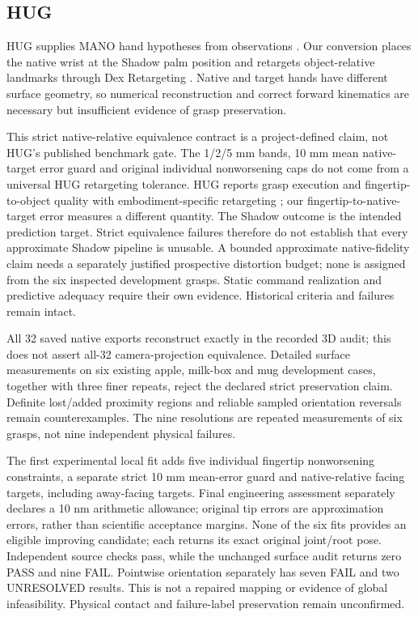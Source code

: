 \documentclass[10pt,letterpaper]{article}
\begin{document}
\subsection{HUG}
HUG supplies MANO hand hypotheses from observations \cite{hug}. Our conversion
places the native wrist at the Shadow palm position and retargets object-relative
landmarks through Dex Retargeting \cite{dex}. Native and target hands have
different surface geometry, so numerical reconstruction and correct forward
kinematics are necessary but insufficient evidence of grasp preservation.

This strict native-relative equivalence contract is a project-defined claim,
not HUG's published benchmark gate. The 1/2/5 mm bands, 10 mm mean
native-target error guard and original individual nonworsening caps do not
come from a universal HUG retargeting tolerance. HUG reports grasp execution
and fingertip-to-object quality with embodiment-specific retargeting
\cite{hug}; our fingertip-to-native-target error measures a different quantity.
The Shadow outcome is the intended prediction target. Strict equivalence
failures therefore do not establish that every approximate Shadow pipeline is
unusable. A bounded approximate native-fidelity claim needs a separately
justified prospective distortion budget; none is assigned from the six
inspected development grasps. Static command realization and predictive
adequacy require their own evidence. Historical criteria and failures remain intact.

All 32 saved native exports reconstruct exactly in the recorded 3D audit;
this does not assert all-32 camera-projection equivalence. Detailed surface
measurements on six existing apple, milk-box and mug development cases, together
with three finer repeats, reject the declared strict preservation claim.
Definite lost/added proximity regions and reliable sampled orientation reversals
remain counterexamples. The nine resolutions are repeated measurements of six
grasps, not nine independent physical failures.

The first experimental local fit adds five individual fingertip nonworsening
constraints, a separate strict 10 mm mean-error guard and native-relative facing
targets, including away-facing targets. Final engineering assessment separately
declares a 10 nm arithmetic allowance; original tip errors are approximation
errors, rather than scientific acceptance margins. None of the six fits provides
an eligible improving candidate; each returns its exact original joint/root pose.
Independent source checks pass, while the unchanged surface audit returns zero
PASS and nine FAIL. Pointwise orientation separately has seven FAIL and two
UNRESOLVED results. This is not a repaired mapping or evidence of global
infeasibility. Physical contact and failure-label preservation remain unconfirmed.
\end{document}
